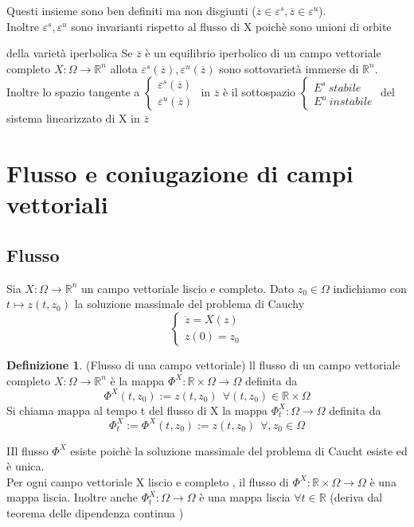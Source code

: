 \documentclass{article}
\theoremstyle{definition}
\newtheorem{definizione}{Definizione}[section]
\newcommand{\R}{\mathbb{R}}
\newcommand{\Rn}{\R^n}
\begin{document}
Questi insieme sono ben definiti ma non disgiunti ($\overline{z} \in \varepsilon^s , \overline{z} \in \varepsilon^u$).\\
Inoltre $	\varepsilon^s,\varepsilon^u$ sono invarianti rispetto al flusso di X poichè sono unioni di orbite 
\begin{teo}{della varietà iperbolica}{}
	Se $\overline{z}$ è un equilibrio iperbolico di un campo vettoriale completo $X: \Omega \rightarrow \Rn$ allota $	\varepsilon^s(\overline{z}) , \varepsilon^u(\overline{z})$ sono sottovarietà immerse di $\Rn$. \\Inoltre lo spazio tangente a $\begin{cases}
		\varepsilon^s(\overline{z}) \\  \varepsilon^u(\overline{z})
	\end{cases}$ in $\overline{z}$ è il sottospazio  $\begin{cases}
	E^s \ stabile \\
	E^u\ instabile
	\end{cases}$ del sistema linearizzato di X in $\overline{z}$
\end{teo}
\newpage
\section{Flusso e coniugazione di campi vettoriali }
\subsection{Flusso}
Sia $X : \Omega \rightarrow \Rn$ un campo vettoriale liscio e completo. Dato $z_0 \in \Omega$ indichiamo con $t \mapsto z(t,z_0)$ la soluzione massimale del problema di Cauchy $$\begin{cases}
	\dot{z}=X(z)\\
	z(0)=z_0
\end{cases}$$
\begin{definizione}(Flusso di una campo vettoriale) \newline
	ll flusso di un campo vettoriale completo  $X : \Omega \rightarrow \Rn$ è la mappa $\Phi^X: \R \times \Omega \rightarrow \Omega $ definita da 
	$$\Phi^X(t,z_0):=z(t,z_0)\ \ \forall(t,z_0 ) \in \R \times \Omega$$
	Si chiama mappa  al tempo t del flusso di X la mappa $\Phi_t^X:  \Omega \rightarrow \Omega $ definita da 
	$$\Phi_t^X:=\Phi^X(t,z_0):=z(t,z_0)\ \ \forall,z_0  \in  \Omega$$
\end{definizione}
IIl flusso $\Phi^X$ esiste poichè la soluzione massimale del problema di Caucht esiste ed è unica.\\
Per ogni campo vettoriale X liscio e completo , il flusso di  $\Phi^X: \R \times \Omega \rightarrow \Omega $  è una mappa liscia. Inoltre anche  $\Phi_t^X:  \Omega \rightarrow \Omega $  è una mappa liscia $\forall t \in \R$ (deriva dal teorema delle dipendenza continua )
\end{document}
